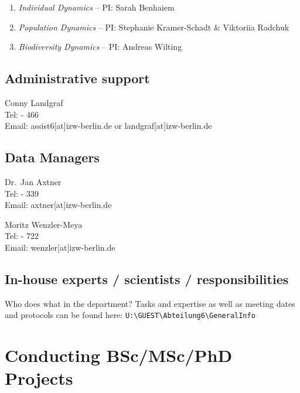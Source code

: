 \documentclass[
  english,
]{article}
\providecommand{\tightlist}{%
  \setlength{\itemsep}{0pt}\setlength{\parskip}{0pt}}
\begin{document}
\begin{enumerate}
\def\labelenumi{(\arabic{enumi})}
\tightlist
\item
  \emph{Individual Dynamics} -- PI: Sarah Benhaiem
\item
  \emph{Population Dynamics} -- PI: Stephanie Kramer-Schadt \& Viktoriia
  Radchuk
\item
  \emph{Biodiversity Dynamics} -- PI: Andreas Wilting
\end{enumerate}

\hypertarget{administrative-support}{%
\subsection{Administrative support}\label{administrative-support}}

Conny Landgraf\\
Tel: - 466\\
Email: assist6{[}at{]}izw-berlin.de or landgraf{[}at{]}izw-berlin.de

\hypertarget{data-managers}{%
\subsection{Data Managers}\label{data-managers}}

Dr.~Jan Axtner\\
Tel: - 339\\
Email: axtner{[}at{]}izw-berlin.de

Moritz Wenzler-Meya\\
Tel: - 722\\
Email: wenzler{[}at{]}izw-berlin.de

\hypertarget{in-house-experts-scientists-responsibilities}{%
\subsection{In-house experts / scientists /
responsibilities}\label{in-house-experts-scientists-responsibilities}}

Who does what in the department? Tasks and expertise as well as meeting
dates and protocols can be found here:
\texttt{U:\textbackslash{}GUEST\textbackslash{}Abteilung6\textbackslash{}GeneralInfo}

\hypertarget{conducting-bscmscphd-projects}{%
\section{Conducting BSc/MSc/PhD
Projects}\label{conducting-bscmscphd-projects}}
\end{document}
